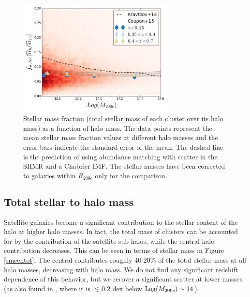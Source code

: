{\begin{figure}\centering
\includegraphics[width=0.7\textwidth]{./chapters/chapter6/figs/f_star_tot_chab_Dec17.png}
\caption{Stellar mass fraction (total stellar mass of each cluster over its halo mass) as a function of halo mass. The data points represent the mean stellar mass fraction values at different halo masses and the error bars indicate the standard error of the mean. The dashed line is the prediction of \citet{kravtsov} using abundance matching with scatter in the SHMR and a Chabrier IMF. The stellar masses have been corrected to galaxies within $R_{200c}$ only for the comparison.}\label{fstot}\end{figure}

\subsection{Total stellar to halo mass}\label{SHMRtot}

Satellite galaxies become a significant contribution to the stellar content of the halo at higher halo masses. In fact, the total mass of clusters can be accounted for by the contribution of the satellite sub-halos, while the central halo contribution decreases. This can be seen in terms of stellar mass in Figure \ref{smcentot}. The central contributes roughly 40-20\% of the total stellar mass at all halo masses, decreasing with halo mass. We do not find any significant redshift dependence of this behavior, but we recover a significant scatter at lower masses (as also found in \citealt{illustris}, where it is $\lesssim 0.2$ dex below ${\rm Log}(M_{200c})\sim 14$).

}
